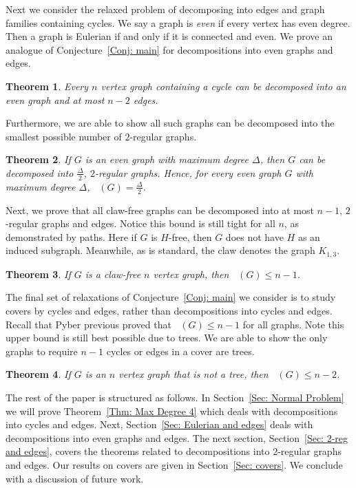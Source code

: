 \documentclass[11pt]{amsart}
\newtheorem{theorem}{Theorem}[section]
\theoremstyle{definition}
\DeclareMathOperator{\Cce}{g_{ce}}
\DeclareMathOperator{\re}{f_{re}}
\begin{document}
Next we consider the relaxed problem of decomposing into edges and graph families containing cycles.
We say a graph is \emph{even} if every vertex has even degree.
Then a graph is Eulerian if and only if it is connected and even.
We prove an analogue of Conjecture~\ref{Conj: main} for decompositions into even graphs and edges.

\begin{theorem}\label{Thm: Eulerian decomp}
    Every $n$ vertex graph containing a cycle can be decomposed into an even graph and at most $n-2$ edges.
\end{theorem}


Furthermore, we are able to show all such graphs can be decomposed into the smallest possible number of $2$-regular graphs.


\begin{theorem}\label{Thm: Even Delta}
    If $G$ is an even graph with maximum degree $\Delta$, then $G$ can be decomposed into $\frac{\Delta}{2}$, $2$-regular graphs.
    Hence, for every even graph $G$ with maximum degree $\Delta$, $\re(G) = \frac{\Delta}{2}$.
\end{theorem}

Next, we prove that all claw-free graphs can be decomposed into at most $n-1$, $2$-regular graphs and edges.
Notice this bound is still tight for all $n$, as demonstrated by paths.
Here if $G$ is $H$-free, then $G$ does not have $H$ as an induced subgraph.
Meanwhile, as is standard, the claw denotes the graph $K_{1,3}$.


\begin{theorem}\label{Thm: Claw-free}
    If $G$ is a claw-free $n$ vertex graph, then $\re(G)\leq n-1$.
\end{theorem}



The final set of relaxations of Conjecture~\ref{Conj: main} we consider is to study covers by cycles and edges, rather than decompositions into cycles and edges.
Recall that Pyber \cite{pyber1985erdHos} previous proved that $\Cce(G) \leq n-1$ for all graphs.
Note this upper bound is still best possible due to trees.
We are able to show the only graphs to require $n-1$ cycles or edges in a cover are trees.

\begin{theorem}\label{Thm: Cover-Cycles and Edges}
    If $G$ is an $n$ vertex graph that is not a tree, then $\Cce(G) \leq n-2$.
\end{theorem}


The rest of the paper is structured as follows.
In Section~\ref{Sec: Normal Problem} we will prove Theorem~\ref{Thm: Max Degree 4} which deals with decompositions into cycles and edges.
Next, Section~\ref{Sec: Eulerian and edges} deals with decompositions into even graphs and edges.
The next section, Section~\ref{Sec: 2-reg and edges}, covers the theorems related to decompositions into $2$-regular graphs and edges.
Our results on covers are given in Section~\ref{Sec: covers}.
We conclude with a discussion of future work.
\end{document}
